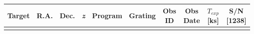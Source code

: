 \documentclass[iop]{emulateapj-rtx4}
\begin{document}
\begin{table}[ht]\footnotesize
\begin{center}
\begin{tabular}{l c c c c c c c c c}
 \hline \hline
  Target & R.A. & Dec. & \textit{z} & Program & Grating & Obs ID & Obs Date & $T_{exp}$ [ks] & S/N [1238] \\ \hline
   
\\

\end{tabular}
\end{center}
\end{table}
\end{document}
